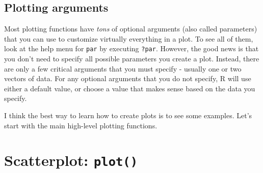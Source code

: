 \documentclass{tufte-book}\usepackage[]{graphicx}\usepackage[]{color}
\begin{document}
\subsection{Plotting arguments}

Most plotting functions have \textit{tons} of optional arguments (also called parameters) that you can use to customize virtually everything in a plot. To see all of them, look at the help menu for \texttt{par} by executing \texttt{?par}. However, the good news is that you don't need to specify all possible parameters you create a plot. Instead, there are only a few critical arguments that you must specify - usually one or two vectors of data. For any optional arguments that you do not specify, R will use either a default value, or choose a value that makes sense based on the data you specify.

I think the best way to learn how to create plots is to see some examples. Let's start with the main high-level plotting functions.

\section{Scatterplot: \texttt{plot()}}
\end{document}
